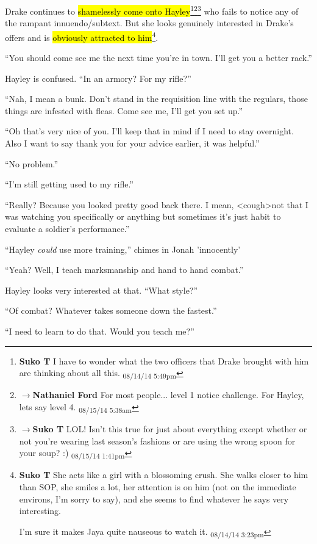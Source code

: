 Drake continues to \hl{shamelessly come onto Hayley}\footnote{\textbf{Suko T }I have to wonder what the two officers that Drake brought with him are thinking about all this. \textsubscript{08/14/14 5:49pm}}\footnote{$\rightarrow$\textbf{Nathaniel Ford }For most people... level 1 notice challenge. For Hayley, lets say level 4. \textsubscript{08/15/14 5:38am}}\footnote{$\rightarrow$\textbf{Suko T }LOL!  Isn't this true for just about everything except whether or not you're wearing last season's fashions or are using the wrong spoon for your soup? :) \textsubscript{08/15/14 1:41pm}} who fails to notice any of the rampant innuendo/subtext.  But she looks genuinely interested in Drake's offers and is \hl{obviously attracted to him}\footnote{\textbf{Suko T }She acts like a girl with a blossoming crush.  She walks closer to him than SOP, she smiles a lot, her attention is on him (not on the immediate environs, I'm sorry to say), and she seems to find whatever he says very interesting.  

I'm sure it makes Jaya quite nauseous to watch it. \textsubscript{08/14/14 3:23pm}}.

``You should come see me the next time you're in town.  I'll get you a better rack.''

Hayley is confused.  ``In an armory?  For my rifle?''

``Nah, I mean a bunk.  Don't stand in the requisition line with the regulars, those things are infested with fleas.  Come see me, I'll get you set up.''

``Oh that's very nice of you.  I'll keep that in mind if I need to stay overnight.  Also I want to say thank you for your advice earlier, it was helpful.''

``No problem.''

``I'm still getting used to my rifle.''

``Really?  Because you looked pretty good back there.  I mean, \textless cough\textgreater  not that I was watching you specifically or anything but sometimes it's just habit to evaluate a soldier's performance.''

``Hayley \textit{could }use more training,'' chimes in Jonah 'innocently'

``Yeah?  Well, I teach marksmanship and hand to hand combat.''

Hayley looks very interested at that.  ``What style?''

``Of combat?  Whatever takes someone down the fastest.''

``I need to learn to do that. Would you teach me?''

